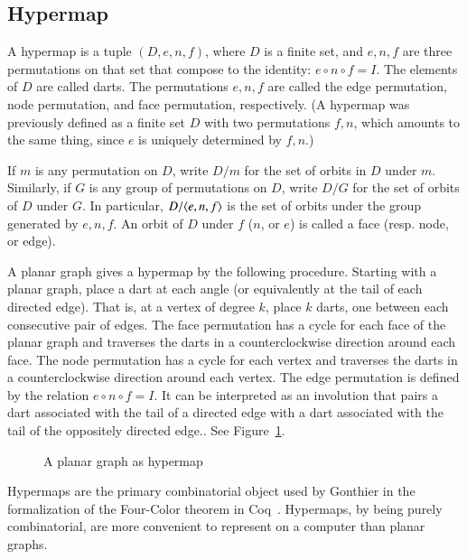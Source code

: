 \documentclass{article} %
\begin{document}
\subsection{Hypermap}

A hypermap is a tuple $(D,e,n,f)$, where $D$ is a finite
set, and $e,n,f$ are three permutations on that set that
compose to the identity:
$e\circ n\circ f = I$.  The elements of $D$ are called darts.
The permutations $e,n,f$ are called the edge permutation,
node permutation, and face permutation, respectively.
(A hypermap was previously defined as a finite set $D$ with
two permutations $f,n$, which amounts to the same thing,
since $e$ is uniquely determined by $f,n$.)

If $m$ is any permutation on $D$, write $D/m$ for the
set of orbits in $D$ under $m$.  Similarly, if $G$ is any
group of permutations on $D$, write $D/G$ for the set
of orbits of $D$ under $G$.  In particular, $D/\langle e,n,f\rangle$
is the set of orbits under the group generated by $e,n,f$.
An orbit of $D$ under $f$ ($n$, or $e$) is called a face (resp.
node, or edge).

A planar graph gives a hypermap
by the following procedure.  Starting with a planar graph,
place a dart at each angle (or equivalently at the tail of each
directed edge).  That is, at a vertex of degree $k$,
place $k$ darts, one between each consecutive pair of edges.
The face permutation has a cycle for
each face of the planar graph and  traverses the
darts in a counterclockwise direction around each face.
The node permutation has a cycle for each vertex and traverses
the darts in a counterclockwise direction around each vertex.
The edge permutation is defined by the relation $e\circ n\circ f=I$.
It can be interpreted as an involution that pairs a dart associated
with the tail of a directed edge with a dart associated with the tail
of the oppositely directed edge..
See Figure~\ref{fig:hypermap}.

\begin{figure}[htb]
  \begin{center}
   \end{center}
  \caption{A planar graph as hypermap}
\label{fig:hypermap}
\end{figure}

Hypermaps are the primary combinatorial object used by Gonthier in the
formalization of the Four-Color theorem in
Coq~\cite{Gonthier:2005:FourColor}. Hypermaps, by being purely
combinatorial, are more convenient to represent on a computer than
planar graphs.
\end{document}
